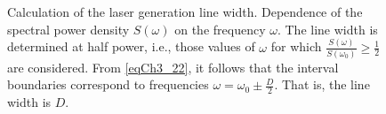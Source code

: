 \begin{figure}
\centering



\caption{Calculation of the laser generation line width. Dependence of the spectral power density $S\left(\omega\right)$ on the frequency $\omega$. The line width is determined at half power, i.e., those values of $\omega$ for which $\frac{S(\omega)}{S(\omega_0)} \ge \frac{1}{2}$ are considered. From \eqref{eqCh3_22}, it follows that the interval boundaries correspond to frequencies $\omega = \omega_0 \pm \frac{D}{2}$. That is, the line width is $D$.}
\label{figPart2Ch1_8}
\end{figure}
